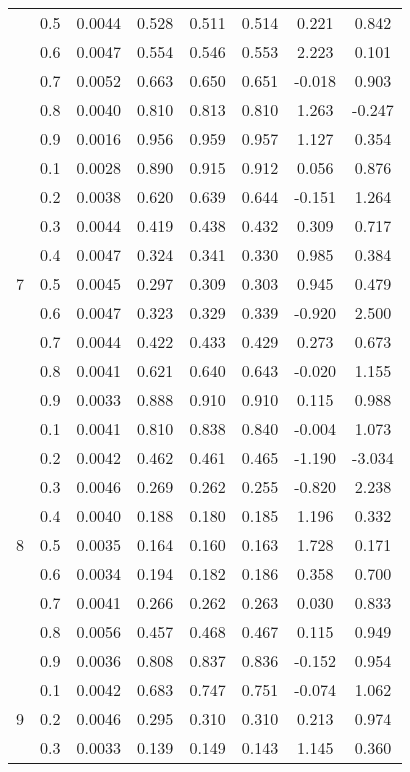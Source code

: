 \documentclass[11pt,a4paper]{report}
\begin{document}
\begin{longtable}{ | c | c || c | c | c | c | c | c | }
 & 0.5 & 0.0044 & 0.528 & 0.511 & 0.514 & 0.221 & 0.842 \\
 & 0.6 & 0.0047 & 0.554 & 0.546 & 0.553 & 2.223 & 0.101 \\
 & 0.7 & 0.0052 & 0.663 & 0.650 & 0.651 & -0.018 & 0.903 \\
 & 0.8 & 0.0040 & 0.810 & 0.813 & 0.810 & 1.263 & -0.247 \\
 & 0.9 & 0.0016 & 0.956 & 0.959 & 0.957 & 1.127 & 0.354 \\
 \hline
\multirow{9}{*}{7} & 0.1 & 0.0028 & 0.890 & 0.915 & 0.912 & 0.056 & 0.876 \\
 & 0.2 & 0.0038 & 0.620 & 0.639 & 0.644 & -0.151 & 1.264 \\
 & 0.3 & 0.0044 & 0.419 & 0.438 & 0.432 & 0.309 & 0.717 \\
 & 0.4 & 0.0047 & 0.324 & 0.341 & 0.330 & 0.985 & 0.384 \\
 & 0.5 & 0.0045 & 0.297 & 0.309 & 0.303 & 0.945 & 0.479 \\
 & 0.6 & 0.0047 & 0.323 & 0.329 & 0.339 & -0.920 & 2.500 \\
 & 0.7 & 0.0044 & 0.422 & 0.433 & 0.429 & 0.273 & 0.673 \\
 & 0.8 & 0.0041 & 0.621 & 0.640 & 0.643 & -0.020 & 1.155 \\
 & 0.9 & 0.0033 & 0.888 & 0.910 & 0.910 & 0.115 & 0.988 \\
 \hline
\multirow{9}{*}{8} & 0.1 & 0.0041 & 0.810 & 0.838 & 0.840 & -0.004 & 1.073 \\
 & 0.2 & 0.0042 & 0.462 & 0.461 & 0.465 & -1.190 & -3.034 \\
 & 0.3 & 0.0046 & 0.269 & 0.262 & 0.255 & -0.820 & 2.238 \\
 & 0.4 & 0.0040 & 0.188 & 0.180 & 0.185 & 1.196 & 0.332 \\
 & 0.5 & 0.0035 & 0.164 & 0.160 & 0.163 & 1.728 & 0.171 \\
 & 0.6 & 0.0034 & 0.194 & 0.182 & 0.186 & 0.358 & 0.700 \\
 & 0.7 & 0.0041 & 0.266 & 0.262 & 0.263 & 0.030 & 0.833 \\
 & 0.8 & 0.0056 & 0.457 & 0.468 & 0.467 & 0.115 & 0.949 \\
 & 0.9 & 0.0036 & 0.808 & 0.837 & 0.836 & -0.152 & 0.954 \\
 \hline
\multirow{9}{*}{9} & 0.1 & 0.0042 & 0.683 & 0.747 & 0.751 & -0.074 & 1.062 \\
 & 0.2 & 0.0046 & 0.295 & 0.310 & 0.310 & 0.213 & 0.974 \\
 & 0.3 & 0.0033 & 0.139 & 0.149 & 0.143 & 1.145 & 0.360 \\

\end{longtable}
\end{document}
